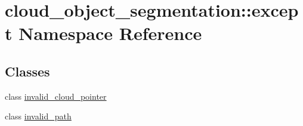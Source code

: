 \hypertarget{namespacecloud__object__segmentation_1_1except}{}\section{cloud\+\_\+object\+\_\+segmentation\+:\+:except Namespace Reference}
\label{namespacecloud__object__segmentation_1_1except}
\subsection*{Classes}
\begin{DoxyCompactItemize}
\item 
class \hyperlink{classcloud__object__segmentation_1_1except_1_1invalid__cloud__pointer}{invalid\+\_\+cloud\+\_\+pointer}
\item 
class \hyperlink{classcloud__object__segmentation_1_1except_1_1invalid__path}{invalid\+\_\+path}
\end{DoxyCompactItemize}
